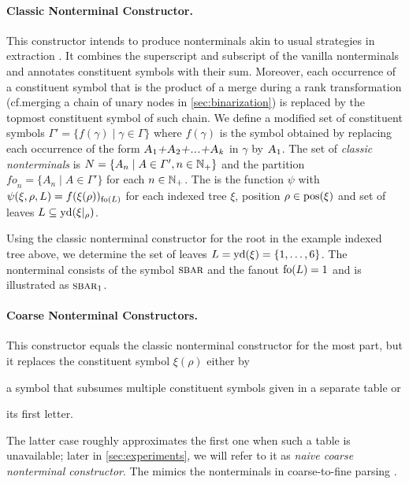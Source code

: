 \documentclass[../../document.tex]{subfiles}
\begin{document}
    \paragraph{Classic Nonterminal Constructor.}
    This constructor intends to produce nonterminals akin to usual strategies in  extraction \citep{MaierSogaard08}.
    It combines the superscript and subscript of the vanilla nonterminals and annotates constituent symbols with their sum.
    Moreover, each occurrence of a constituent symbol that is the product of a merge during a rank transformation (cf.\@ merging a chain of unary nodes in \cref{sec:binarization}) is replaced by the topmost constituent symbol of such chain.
    We define a modified set of constituent symbols \(\varGamma' = \{ f(\gamma) \mid \gamma \in \varGamma \}\) where \(f(\gamma)\) is the symbol obtained by replacing each occurrence of the form \(\textsc{\textsl{A$_1$+A$_2$+...+A$_k$}}\) in \(\gamma\) by \(\textsc{\textsl{A$_1$}}\).
    The set of \emph{classic nonterminals} is \(N = \{ A_n \mid A \in \varGamma', n \in \mathbb{N}_+ \}\) and the partition \(\mathit{fo}_n = \{A_n \mid A \in \varGamma'\}\) for each \(n \in \mathbb{N}_+\).
    The  is the function \(\psi\) with \(\psi(\xi, \rho, L) = f(\xi(\rho))_{\operatorname{fo}(L)}\) for each indexed tree \(\xi\), position \(\rho \in \operatorname{pos}(\xi)\) and set of leaves \(L \subseteq \operatorname{yd}(\xi|_\rho)\).

    \begin{example}
        Using the classic nonterminal constructor for the root in the example indexed tree above, we determine the set of leaves \(L = \operatorname{yd}(\xi) = \{1,\ldots,6\}\).
        The nonterminal consists of the symbol \(\textsc{sbar}\) and the fanout \(\operatorname{fo}(L) = 1\) and is illustrated as \(\textsc{sbar}_1\).
    \end{example}

    \paragraph{Coarse Nonterminal Constructors.}
    This constructor equals the classic nonterminal constructor for the most part, but it replaces the constituent symbol \(\xi(\rho)\) either by
    \begin{inparaenum}
        \item a symbol that subsumes multiple constituent symbols given in a separate table or
        \item its first letter.
    \end{inparaenum}
    The latter case roughly approximates the first one when such a table is unavailable; later in \cref{sec:experiments}, we will refer to it as \emph{naive coarse nonterminal constructor}.
    The  mimics the nonterminals in coarse-to-fine parsing \citep{Cha06,Tei17}.
\end{document}
